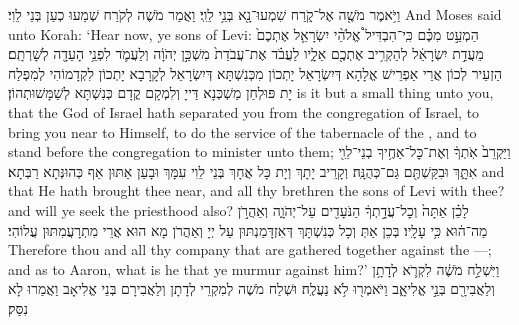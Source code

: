 {וַיֹּ֥אמֶר מֹשֶׁ֖ה אֶל־קֹ֑רַח שִׁמְעוּ־נָ֖א בְּנֵ֥י לֵוִֽי׃
}
{וַאֲמַר מֹשֶׁה לְקֹרַח שְׁמַעוּ כְעַן בְּנֵי לֵוִי׃}
{And Moses said unto Korah: ‘Hear now, ye sons of Levi:}{}
{הַמְעַ֣ט מִכֶּ֗ם כִּֽי־הִבְדִּיל֩ אֱלֹהֵ֨י יִשְׂרָאֵ֤ל אֶתְכֶם֙ מֵעֲדַ֣ת יִשְׂרָאֵ֔ל לְהַקְרִ֥יב אֶתְכֶ֖ם אֵלָ֑יו לַעֲבֹ֗ד אֶת־עֲבֹדַת֙ מִשְׁכַּ֣ן יְהֹוָ֔ה וְלַעֲמֹ֛ד לִפְנֵ֥י הָעֵדָ֖ה לְשָׁרְתָֽם׃
}
{הַזְעֵיר לְכוֹן אֲרֵי אַפְרֵישׁ אֱלָהָא דְּיִשְׂרָאֵל יָתְכוֹן מִכְּנִשְׁתָּא דְּיִשְׂרָאֵל לְקָרָבָא יָתְכוֹן לִקְדָמוֹהִי לְמִפְלַח יָת פּוּלְחַן מַשְׁכְּנָא דַּייָ וְלִמְקָם קֳדָם כְּנִשְׁתָּא לְשַׁמָּשׁוּתְהוֹן׃}
{is it but a small thing unto you, that the God of Israel hath separated you from the congregation of Israel, to bring you near to Himself, to do the service of the tabernacle of the \lord, and to stand before the congregation to minister unto them;}{}
{וַיַּקְרֵב֙ אֹֽתְךָ֔ וְאֶת־כׇּל־אַחֶ֥יךָ בְנֵי־לֵוִ֖י אִתָּ֑ךְ וּבִקַּשְׁתֶּ֖ם גַּם־כְּהֻנָּֽה׃
}
{וְקָרֵיב יָתָךְ וְיָת כָּל אֲחָךְ בְּנֵי לֵוִי עִמָּךְ וּבָעַן אַתּוּן אַף כְּהוּנְּתָא רַבְּתָא׃}
{and that He hath brought thee near, and all thy brethren the sons of Levi with thee? and will ye seek the priesthood also?}{}
{לָכֵ֗ן אַתָּה֙ וְכׇל־עֲדָ֣תְךָ֔ הַנֹּעָדִ֖ים עַל־יְהֹוָ֑ה וְאַהֲרֹ֣ן מַה־ה֔וּא כִּ֥י  עָלָֽיו׃
}
{בְּכֵן אַתְּ וְכָל כְּנִשְׁתָּךְ דְּאִזְדָּמַנְתּוּן עַל יְיָ וְאַהֲרֹן מָא הוּא אֲרֵי מִתְרָעֲמִתּוּן עֲלוֹהִי׃}
{Therefore thou and all thy company that are gathered together against the \lord—; and as to Aaron, what is he that ye murmur against him?’}{}
{וַיִּשְׁלַ֣ח מֹשֶׁ֔ה לִקְרֹ֛א לְדָתָ֥ן וְלַאֲבִירָ֖ם בְּנֵ֣י אֱלִיאָ֑ב וַיֹּאמְר֖וּ לֹ֥א נַעֲלֶֽה׃
}
{וּשְׁלַח מֹשֶׁה לְמִקְרֵי לְדָתָן וְלַאֲבִירָם בְּנֵי אֱלִיאָב וַאֲמַרוּ לָא נִסַּק׃}
